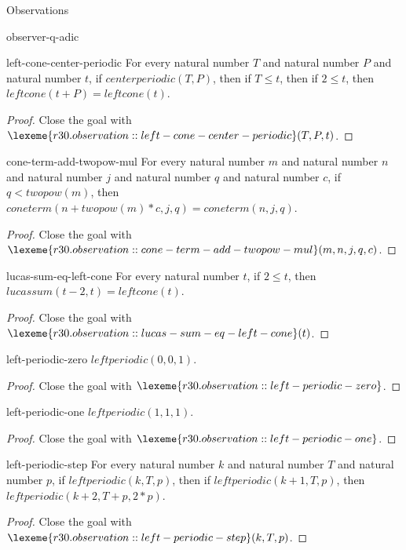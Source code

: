 \begin{lexlean}{Observations}
\begin{section}{observer-q-adic}
\begin{theorem}{left-cone-center-periodic}
For every natural number \(T\) and natural number \(P\) and natural number \(t\), if \(centerperiodic(T, P)\), then if \(T ≤ t\), then if \(2 ≤ t\), then \(leftcone(t + P) = leftcone(t)\).
\begin{proof}
Close the goal with \(\lexeme{r30.observation::left-cone-center-periodic}(T, P, t)\).
\end{proof}
\end{theorem}

\begin{theorem}{cone-term-add-twopow-mul}
For every natural number \(m\) and natural number \(n\) and natural number \(j\) and natural number \(q\) and natural number \(c\), if \(q < twopow(m)\), then \(coneterm(n + twopow(m) * c, j, q) = coneterm(n, j, q)\).
\begin{proof}
Close the goal with \(\lexeme{r30.observation::cone-term-add-twopow-mul}(m, n, j, q, c)\).
\end{proof}
\end{theorem}

\begin{theorem}{lucas-sum-eq-left-cone}
For every natural number \(t\), if \(2 ≤ t\), then \(lucassum(t - 2, t) = leftcone(t)\).
\begin{proof}
Close the goal with \(\lexeme{r30.observation::lucas-sum-eq-left-cone}(t)\).
\end{proof}
\end{theorem}

\begin{theorem}{left-periodic-zero}
\(leftperiodic(0, 0, 1)\).
\begin{proof}
Close the goal with \(\lexeme{r30.observation::left-periodic-zero}\).
\end{proof}
\end{theorem}

\begin{theorem}{left-periodic-one}
\(leftperiodic(1, 1, 1)\).
\begin{proof}
Close the goal with \(\lexeme{r30.observation::left-periodic-one}\).
\end{proof}
\end{theorem}

\begin{theorem}{left-periodic-step}
For every natural number \(k\) and natural number \(T\) and natural number \(p\), if \(leftperiodic(k, T, p)\), then if \(leftperiodic(k + 1, T, p)\), then \(leftperiodic(k + 2, T + p, 2 * p)\).
\begin{proof}
Close the goal with \(\lexeme{r30.observation::left-periodic-step}(k, T, p)\).
\end{proof}
\end{theorem}


\end{section}
\end{lexlean}
